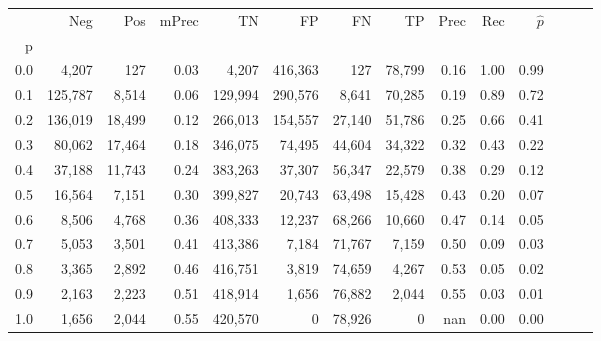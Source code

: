\begin{tabular}{rrrrrrrrrrrrrr}
\toprule
{} &      Neg &     Pos & mPrec &       TN &       FP &      FN &      TP &  Prec &   Rec & $\hat{p}$ \\
p   &          &         &       &          &          &         &         &       &       &           \\
\midrule
0.0 &    4,207 &     127 &  0.03 &    4,207 &  416,363 &     127 &  78,799 &  0.16 &  1.00 &      0.99 \\
0.1 &  125,787 &   8,514 &  0.06 &  129,994 &  290,576 &   8,641 &  70,285 &  0.19 &  0.89 &      0.72 \\
0.2 &  136,019 &  18,499 &  0.12 &  266,013 &  154,557 &  27,140 &  51,786 &  0.25 &  0.66 &      0.41 \\
0.3 &   80,062 &  17,464 &  0.18 &  346,075 &   74,495 &  44,604 &  34,322 &  0.32 &  0.43 &      0.22 \\
0.4 &   37,188 &  11,743 &  0.24 &  383,263 &   37,307 &  56,347 &  22,579 &  0.38 &  0.29 &      0.12 \\
0.5 &   16,564 &   7,151 &  0.30 &  399,827 &   20,743 &  63,498 &  15,428 &  0.43 &  0.20 &      0.07 \\
0.6 &    8,506 &   4,768 &  0.36 &  408,333 &   12,237 &  68,266 &  10,660 &  0.47 &  0.14 &      0.05 \\
0.7 &    5,053 &   3,501 &  0.41 &  413,386 &    7,184 &  71,767 &   7,159 &  0.50 &  0.09 &      0.03 \\
0.8 &    3,365 &   2,892 &  0.46 &  416,751 &    3,819 &  74,659 &   4,267 &  0.53 &  0.05 &      0.02 \\
0.9 &    2,163 &   2,223 &  0.51 &  418,914 &    1,656 &  76,882 &   2,044 &  0.55 &  0.03 &      0.01 \\
1.0 &    1,656 &   2,044 &  0.55 &  420,570 &        0 &  78,926 &       0 &   nan &  0.00 &      0.00 \\
\bottomrule
\end{tabular}
